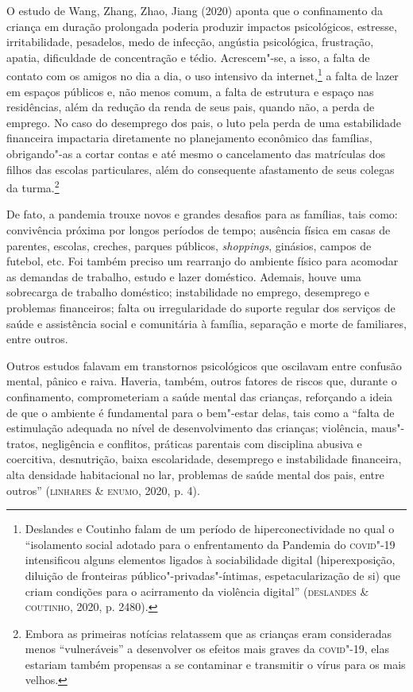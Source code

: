 O estudo de Wang, Zhang, Zhao, Jiang (2020) aponta que o confinamento da
criança em duração prolongada poderia produzir impactos psicológicos,
estresse, irritabilidade, pesadelos, medo de infecção, angústia
psicológica, frustração, apatia, dificuldade de concentração e tédio.
Acrescem"-se, a isso, a falta de contato com os amigos no dia a dia, o
uso intensivo da internet,\footnote{Deslandes e Coutinho falam de um
  período de hiperconectividade no qual o ``isolamento social adotado
  para o enfrentamento da Pandemia do \textsc{covid}"-19 intensificou alguns
  elementos ligados à sociabilidade digital (hiperexposição, diluição de
  fronteiras público"-privadas"-íntimas, espetacularização de si) que
  criam condições para o acirramento da violência digital'' (\textsc{deslandes}
  \& \textsc{coutinho}, 2020, p. 2480).} a falta de lazer em espaços públicos e,
não menos comum, a falta de estrutura e espaço nas residências, além da
redução da renda de seus pais, quando não, a perda de emprego. No caso
do desemprego dos pais, o luto pela perda de uma estabilidade financeira
impactaria diretamente no planejamento econômico das famílias,
obrigando"-as a cortar contas e até mesmo o cancelamento das matrículas
dos filhos das escolas particulares, além do consequente afastamento de
seus colegas da turma.\footnote{Embora as primeiras notícias relatassem
  que as crianças eram consideradas menos ``vulneráveis'' a desenvolver
  os efeitos mais graves da \textsc{covid}"-19, elas estariam também propensas a
  se contaminar e transmitir o vírus para os mais velhos.}

De fato, a pandemia trouxe novos e grandes desafios para as famílias,
tais como: convivência próxima por longos períodos de tempo; ausência
física em casas de parentes, escolas, creches, parques públicos,
\emph{shoppings}, ginásios, campos de futebol, etc. Foi também preciso
um rearranjo do ambiente físico para acomodar as demandas de trabalho,
estudo e lazer doméstico. Ademais, houve uma sobrecarga de trabalho
doméstico; instabilidade no emprego, desemprego e problemas financeiros;
falta ou irregularidade do suporte regular dos serviços de saúde e
assistência social e comunitária à família, separação e morte de
familiares, entre outros.

Outros estudos falavam em transtornos psicológicos que oscilavam entre
confusão mental, pânico e raiva. Haveria, também, outros fatores de
riscos que, durante o confinamento, comprometeriam a saúde mental das
crianças, reforçando a ideia de que o ambiente é fundamental para o
bem"-estar delas, tais como a ``falta de estimulação adequada no nível de
desenvolvimento das crianças; violência, maus"-tratos, negligência e
conflitos, práticas parentais com disciplina abusiva e coercitiva,
desnutrição, baixa escolaridade, desemprego e instabilidade financeira,
alta densidade habitacional no lar, problemas de saúde mental dos pais,
entre outros'' (\textsc{linhares} \& \textsc{enumo}, 2020, p. 4).


